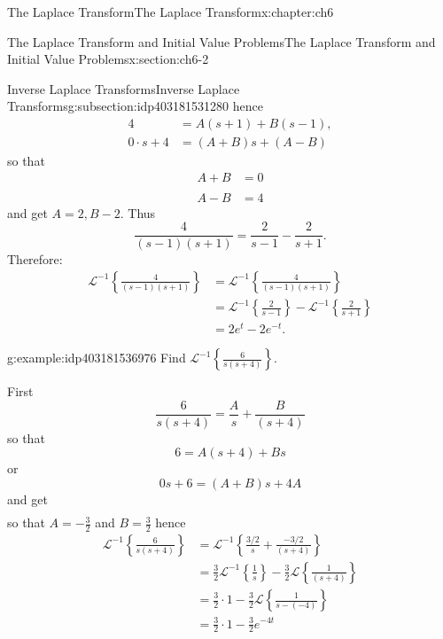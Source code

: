 \documentclass[oneside,10pt,]{book}
\numberwithin{equation}{section}
\numberwithin{equation}{section}
\newcommand{\amp}{&}
\begin{document}
\begin{chapterptx}{The Laplace Transform}{}{The Laplace Transform}{}{}{x:chapter:ch6}
\begin{sectionptx}{The Laplace Transform and Initial Value Problems}{}{The Laplace Transform and Initial Value Problems}{}{}{x:section:ch6-2}
\begin{subsectionptx}{Inverse Laplace Transforms}{}{Inverse Laplace Transforms}{}{}{g:subsection:idp403181531280}
hence%
\begin{align*}
4 \amp =A\left(s+1\right)+B\left(s-1\right),\\
0\cdot s+4 \amp =\left(A+B\right)s+\left(A-B\right)
\end{align*}
so that%
\begin{align*}
A+B \amp =0\\\\
A-B \amp =4
\end{align*}
and get \(A=2,B-2\). Thus%
\begin{equation*}
\frac{4}{\left(s-1\right)\left(s+1\right)}=\frac{2}{s-1}-\frac{2}{s+1}.
\end{equation*}
Therefore:%
\begin{align*}
\mathcal{L}^{-1}\left\{ \frac{4}{\left(s-1\right)\left(s+1\right)}\right\}  \amp =\mathcal{L}^{-1}\left\{ \frac{4}{\left(s-1\right)\left(s+1\right)}\right\}\\
\amp =\mathcal{L}^{-1}\left\{ \frac{2}{s-1}\right\} -\mathcal{L}^{-1}\left\{ \frac{2}{s+1}\right\} \\
\amp =2e^{t}-2e^{-t}.
\end{align*}
%
\begin{example}{}{g:example:idp403181536976}%
Find \(\mathcal{L}^{-1}\left\{ \frac{6}{s\left(s+4\right)}\right\} \).%
\par
First%
\begin{equation*}
\frac{6}{s\left(s+4\right)}=\frac{A}{s}+\frac{B}{\left(s+4\right)}
\end{equation*}
so that%
\begin{equation*}
6=A\left(s+4\right)+Bs
\end{equation*}
or%
\begin{equation*}
0s+6=\left(A+B\right)s+4A
\end{equation*}
and get%
\begin{align*}
\end{align*}
so that \(A=-\frac{3}{2}\) and \(B=\frac{3}{2}\) hence%
\begin{align*}
\mathcal{L}^{-1}\left\{ \frac{6}{s\left(s+4\right)}\right\}  \amp =\mathcal{L}^{-1}\left\{ \frac{3/2}{s}+\frac{-3/2}{\left(s+4\right)}\right\} \\
\amp =\frac{3}{2}\mathcal{L}^{-1}\left\{ \frac{1}{s}\right\} -\frac{3}{2}\mathcal{L}\left\{ \frac{1}{\left(s+4\right)}\right\} \\
\amp =\frac{3}{2}\cdot1-\frac{3}{2}\mathcal{L}\left\{ \frac{1}{s-(-4)}\right\} \\
\amp =\frac{3}{2}\cdot1-\frac{3}{2}e^{-4t}

\end{align*}
\end{example}
\end{subsectionptx}
\end{sectionptx}
\end{chapterptx}
\end{document}
